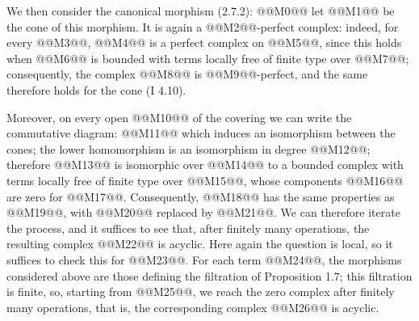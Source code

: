 We then consider the canonical morphism (2.7.2):
@@M0@@
let @@M1@@ be the cone of this morphism. It is again a @@M2@@-perfect complex: indeed, for every @@M3@@, @@M4@@ is a perfect complex on @@M5@@, since this holds when @@M6@@ is bounded with terms locally free of finite type over @@M7@@; consequently, the complex @@M8@@ is @@M9@@-perfect, and the same therefore holds for the cone (I 4.10).

Moreover, on every open @@M10@@ of the covering we can write the commutative diagram:
@@M11@@
which induces an isomorphism between the cones; the lower homomorphism is an isomorphism in degree @@M12@@; therefore @@M13@@ is isomorphic over @@M14@@ to a bounded complex with terms locally free of finite type over @@M15@@, whose components @@M16@@ are zero for @@M17@@. Consequently, @@M18@@ has the same properties as @@M19@@, with @@M20@@ replaced by @@M21@@. We can therefore iterate the process, and it suffices to see that, after finitely many operations, the resulting complex @@M22@@ is acyclic. Here again the question is local, so it suffices to check this for @@M23@@. For each term @@M24@@, the morphisms considered above are those defining the filtration of Proposition 1.7; this filtration is finite, so, starting from @@M25@@, we reach the zero complex after finitely many operations, that is, the corresponding complex @@M26@@ is acyclic.

